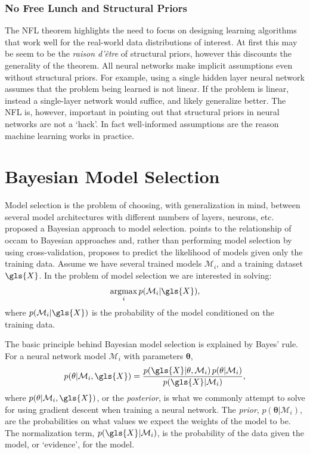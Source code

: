\documentclass[thesis]{subfiles}
\begin{document}
\subsubsection{No Free Lunch and Structural Priors}
The NFL theorem highlights the need to focus on designing learning algorithms that work well for the real-world data distributions of interest. At first this may be seem to be the \emph{raison d'\^{e}tre} of structural priors, however this discounts the generality of the theorem. All neural networks make implicit assumptions even without structural priors. For example, using a single hidden layer neural network assumes that the problem being learned is not linear. If the problem is linear, instead a single-layer network would suffice, and likely generalize better. The NFL is, however, important in pointing out that structural priors in neural networks are not a `hack'. In fact well-informed assumptions are the reason machine learning works in practice.

\section{Bayesian Model Selection}
Model selection is the problem of choosing, with generalization in mind, between several model architectures with different numbers of layers, neurons, etc. 
\citet{MacKay91,mackay1992practical,mackay1995} proposed a Bayesian approach to model selection. \citeauthor{mackay1992practical} points to the relationship of \gls{occam} to Bayesian approaches and, rather than performing model selection by using cross-validation, \citeauthor{mackay1992practical} proposes to predict the likelihood of models given only the training data. Assume we have several trained models $\mathcal{M}_i$, and a training dataset $\gls{X}$. In the problem of model selection we are interested in solving:
\begin{equation}
	\argmax_i p(\mathcal{M}_i|\gls{X}),
\end{equation}
where $p(\mathcal{M}_i|\gls{X})$ is the probability of the model conditioned on the training data.

The basic principle behind Bayesian model selection is explained by Bayes' rule. For a neural network model $\mathcal{M}_i$ with parameters $\mathbf{\theta}$,
\begin{equation}
	p(\mathbf{\theta}|\mathcal{M}_i,\gls{X}) = \frac{p(\gls{X}|\mathbf{\theta},\mathcal{M}_i)\,p(\mathbf{\theta}|\mathcal{M}_i)}{p(\gls{X}|\mathcal{M}_i)},
\end{equation}
where $p(\mathbf{\theta}|\mathcal{M}_i,\gls{X})$, or the \emph{posterior}, is what we commonly attempt to solve for using gradient descent when training a neural network.
The \emph{prior}, $p(\mathbf{\theta}|\mathcal{M}_i)$, are the probabilities on what values we expect the weights of the model to be. The normalization term, $p(\gls{X}|\mathcal{M}_i)$, is the probability of the data given the model, or `evidence', for the model.
\end{document}
